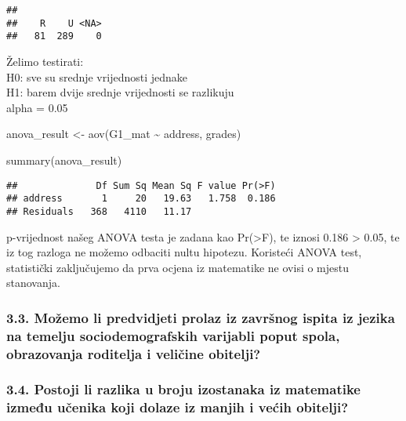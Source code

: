 \documentclass[
]{article}
\newenvironment{Shaded}{\begin{snugshade}}{\end{snugshade}}
\newcommand{\FunctionTok}[1]{\textcolor[rgb]{0.00,0.00,0.00}{#1}}
\newcommand{\NormalTok}[1]{#1}
\newcommand{\OtherTok}[1]{\textcolor[rgb]{0.56,0.35,0.01}{#1}}
\newcommand{\SpecialCharTok}[1]{\textcolor[rgb]{0.00,0.00,0.00}{#1}}
\begin{document}
\begin{verbatim}
## 
##    R    U <NA> 
##   81  289    0
\end{verbatim}

Želimo testirati:\\
H0: sve su srednje vrijednosti jednake\\
H1: barem dvije srednje vrijednosti se razlikuju\\
alpha = 0.05

\begin{Shaded}
\begin{Highlighting}[]
\NormalTok{anova\_result }\OtherTok{\textless{}{-}} \FunctionTok{aov}\NormalTok{(G1\_mat }\SpecialCharTok{\textasciitilde{}}\NormalTok{ address, grades)}

\FunctionTok{summary}\NormalTok{(anova\_result)}
\end{Highlighting}
\end{Shaded}

\begin{verbatim}
##              Df Sum Sq Mean Sq F value Pr(>F)
## address       1     20   19.63   1.758  0.186
## Residuals   368   4110   11.17
\end{verbatim}

p-vrijednost našeg ANOVA testa je zadana kao Pr(\textgreater F), te
iznosi 0.186 \textgreater{} 0.05, te iz tog razloga ne možemo odbaciti
nultu hipotezu. Koristeći ANOVA test, statistički zaključujemo da prva
ocjena iz matematike ne ovisi o mjestu stanovanja.

\hypertarget{moux17eemo-li-predvidjeti-prolaz-iz-zavrux161nog-ispita-iz-jezika-na-temelju-sociodemografskih-varijabli-poput-spola-obrazovanja-roditelja-i-veliux10dine-obitelji}{%
\subsubsection{3.3. Možemo li predvidjeti prolaz iz završnog ispita iz
jezika na temelju sociodemografskih varijabli poput spola, obrazovanja
roditelja i veličine
obitelji?}\label{moux17eemo-li-predvidjeti-prolaz-iz-zavrux161nog-ispita-iz-jezika-na-temelju-sociodemografskih-varijabli-poput-spola-obrazovanja-roditelja-i-veliux10dine-obitelji}}

\hypertarget{postoji-li-razlika-u-broju-izostanaka-iz-matematike-izmeux111u-uux10denika-koji-dolaze-iz-manjih-i-veux107ih-obitelji}{%
\subsubsection{3.4. Postoji li razlika u broju izostanaka iz matematike
između učenika koji dolaze iz manjih i većih
obitelji?}\label{postoji-li-razlika-u-broju-izostanaka-iz-matematike-izmeux111u-uux10denika-koji-dolaze-iz-manjih-i-veux107ih-obitelji}}
\end{document}
